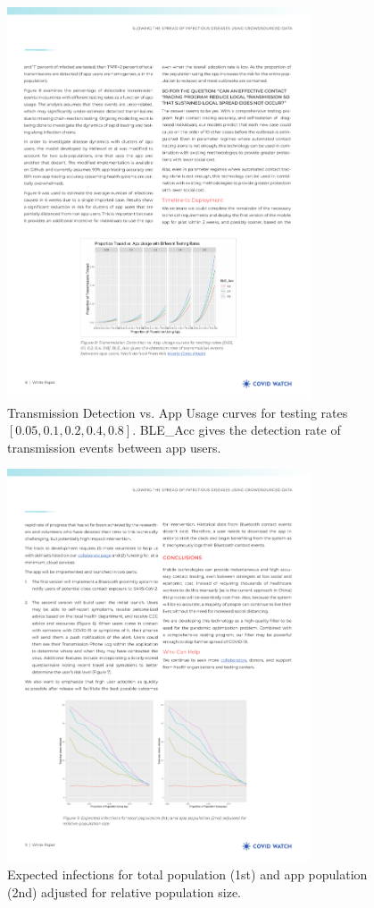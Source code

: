 \documentclass[11pt]{article}
\begin{document}
\begin{figure}[ht]
\centering
\includegraphics[width=0.8\textwidth]{figs/fig7.pdf} 
\caption{Transmission Detection vs. App Usage curves for testing rates $[0.05, 0.1, 0.2, 0.4, 0.8]$. BLE\_Acc gives the detection rate of transmission events between app users.}
\label{transdect}
\end{figure}


\begin{figure}[ht]
\centering
\includegraphics[width=0.8\textwidth]{figs/fig8.pdf} 
\caption{Expected infections for total population (1st) and app population (2nd) adjusted for relative population size.}
\label{expinf}
\end{figure}
\end{document}
